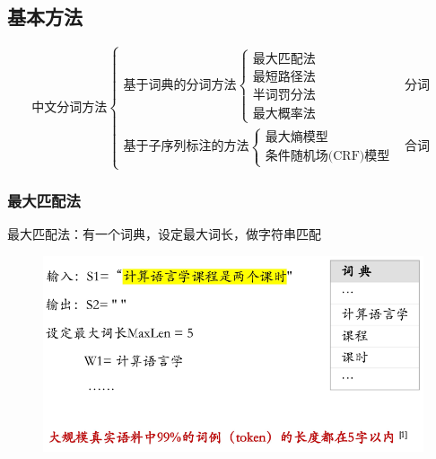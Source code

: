 \subsection{基本方法}
\[\text{中文分词方法}\begin{cases}
\text{基于词典的分词方法}\begin{cases}
\text{最大匹配法}\\
\text{最短路径法}\\
\text{半词罚分法}\\
\text{最大概率法}
\end{cases} & \text{分词}\\
\text{基于子序列标注的方法}\begin{cases}
\text{最大熵模型}\\
\text{条件随机场(CRF)模型}
\end{cases} & \text{合词}
\end{cases}\]

\subsubsection{最大匹配法}
最大匹配法：有一个词典，设定最大词长，做字符串匹配
\begin{figure}[H]
\centering
\includegraphics[width=0.6\linewidth]{fig/max_matching.png}
\end{figure}

